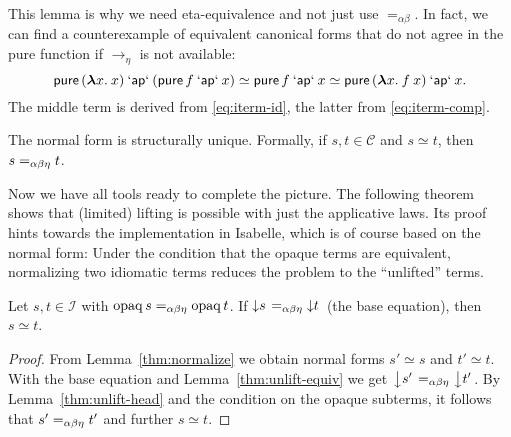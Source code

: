 This lemma is why we need eta-equivalence and not just use $=_{\alpha\beta}$.
In fact, we can find a counterexample of equivalent canonical forms that do
not agree in the pure function if $\to_\eta$ is not available:
\[ \operatorname{\mathsf{pure}}{({\boldsymbol\lambda} x.\>x)} \mathbin{\mathsf{`ap`}} (\operatorname{\mathsf{pure}} f \mathbin{\mathsf{`ap`}} x) \simeq
	\operatorname{\mathsf{pure}} f \mathbin{\mathsf{`ap`}} x \simeq \operatorname{\mathsf{pure}}{({\boldsymbol\lambda} x.\>f \> x)} \mathbin{\mathsf{`ap`}} x. \]
The middle term is derived from \eqref{eq:iterm-id}, the latter from
\eqref{eq:iterm-comp}.

\begin{corollary}\label{thm:nf-unique}
The normal form is structurally unique.
Formally, if $s,t \in \mathcal{C}$ and $s \simeq t$, then $s =_{\alpha\beta\eta} t$.
\end{corollary}

Now we have all tools ready to complete the picture.
The following theorem shows that (limited) lifting is possible with just
the applicative laws.
Its proof hints towards the implementation in Isabelle, which is of course
based on the normal form:
Under the condition that the opaque terms are equivalent, normalizing two
idiomatic terms reduces the problem to the ``unlifted'' terms.

\begin{theorem}\label{thm:nf-lifting}
Let $s,t \in \mathcal{I}$ with $\operatorname{opaq} s =_{\alpha\beta\eta} \operatorname{opaq} t$.
If $\left\downarrow s\right. =_{\alpha\beta\eta} \left\downarrow t\right.$ (the base equation), then $s \simeq t$.
\end{theorem}
\begin{proof}
From Lemma~\ref{thm:normalize} we obtain normal forms $s' \simeq s$ and
$t' \simeq t$.
With the base equation and Lemma~\ref{thm:unlift-equiv} we get
$\left\downarrow s'\right. =_{\alpha\beta\eta} \left\downarrow t'\right.$.
By Lemma~\ref{thm:unlift-head} and the condition on the opaque subterms, it
follows that $s' =_{\alpha\beta\eta} t'$ and further $s \simeq t$.
\end{proof}
